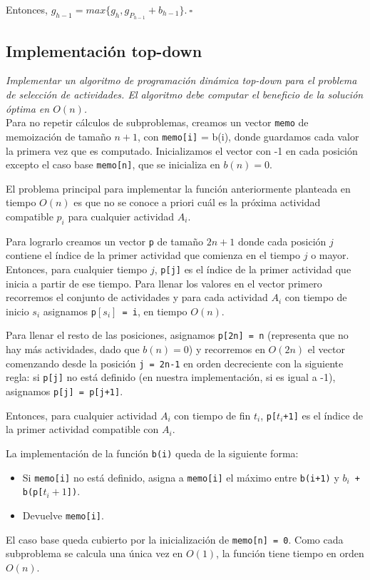 \documentclass[10pt, a4paper]{article}
\begin{document}
Entonces, $g_{h-1} = max\{g_h, g_{P_{h-1}} + b_{h-1}\}. \ \square$
\subsection{Implementación top-down}
\emph{Implementar un algoritmo de programación dinámica top-down para el problema de selección de actividades. El algoritmo debe computar el beneficio de la solución óptima en $O(n)$.} \\

Para no repetir cálculos de subproblemas, creamos un vector \texttt{memo} de memoización de tamaño $n+1$, con \texttt{memo[i]} = b(i), donde guardamos cada valor la primera vez que es computado. Inicializamos el vector con -1 en cada posición excepto el caso base \texttt{memo[n]}, que se inicializa en $b(n) = 0$.

El problema principal para implementar la función anteriormente planteada en tiempo $O(n)$ es que no se conoce a priori cuál es la próxima actividad compatible $p_i$ para cualquier actividad $A_i$.

Para lograrlo creamos un vector \texttt{p} de tamaño $2n+1$ donde cada posición $j$ contiene el índice de la primer actividad que comienza en el tiempo $j$ o mayor. Entonces, para cualquier tiempo $j$, \texttt{p[j]} es el índice de la primer actividad que inicia a partir de ese tiempo. Para llenar los valores en el vector primero recorremos el conjunto de actividades y para cada actividad $A_i$ con tiempo de inicio $s_i$ asignamos \texttt{p$[s_i]$ = i}, en tiempo $O(n)$. 

Para llenar el resto de las posiciones, asignamos \texttt{p[2n] = n} (representa que no hay más actividades, dado que $b(n) = 0$) y recorremos en $O(2n)$ el vector comenzando desde la posición \texttt{j = 2n-1} en orden decreciente con la siguiente regla: si \texttt{p[j]} no está definido (en nuestra implementación, si es igual a -1), asignamos \texttt{p[j] = p[j+1]}.

Entonces, para cualquier actividad $A_i$ con tiempo de fin $t_i$, \texttt{p[$t_i$+1]} es el índice de la primer actividad compatible con $A_i$.

La implementación de la función \texttt{b(i)} queda de la siguiente forma:
\begin{itemize}
    \item Si \texttt{memo[i]} no está definido, asigna a \texttt{memo[i]} el máximo entre \texttt{b(i+1)} y \texttt{$b_i$ + b(p[$t_{i}+1$])}.
    \item Devuelve \texttt{memo[i]}.
\end{itemize}
El caso base queda cubierto por la inicialización de \texttt{memo[n] = 0}. Como cada subproblema se calcula una única vez en $O(1)$, la función tiene tiempo en orden $O(n)$.
\end{document}
